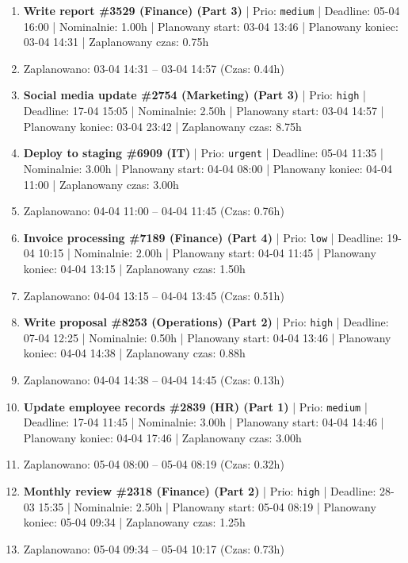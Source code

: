 {\begin{enumerate}
  \item [\textbf{14672}] \textbf{Write report \#3529 (Finance) (Part 3)} | Prio: \texttt{medium} | Deadline: 05-04 16:00 | Nominalnie: 1.00h | Planowany start: 03-04 13:46 | Planowany koniec: 03-04 14:31 | Zaplanowany czas: 0.75h
  \item [\textbf{PRZERWA}] Zaplanowano: 03-04 14:31 -- 03-04 14:57 (Czas: 0.44h)
  \item [\textbf{14611}] \textbf{Social media update \#2754 (Marketing) (Part 3)} | Prio: \texttt{high} | Deadline: 17-04 15:05 | Nominalnie: 2.50h | Planowany start: 03-04 14:57 | Planowany koniec: 03-04 23:42 | Zaplanowany czas: 8.75h
  \item [\textbf{14597}] \textbf{Deploy to staging \#6909 (IT)} | Prio: \texttt{urgent} | Deadline: 05-04 11:35 | Nominalnie: 3.00h | Planowany start: 04-04 08:00 | Planowany koniec: 04-04 11:00 | Zaplanowany czas: 3.00h
  \item [\textbf{PRZERWA}] Zaplanowano: 04-04 11:00 -- 04-04 11:45 (Czas: 0.76h)
  \item [\textbf{14678}] \textbf{Invoice processing \#7189 (Finance) (Part 4)} | Prio: \texttt{low} | Deadline: 19-04 10:15 | Nominalnie: 2.00h | Planowany start: 04-04 11:45 | Planowany koniec: 04-04 13:15 | Zaplanowany czas: 1.50h
  \item [\textbf{PRZERWA}] Zaplanowano: 04-04 13:15 -- 04-04 13:45 (Czas: 0.51h)
  \item [\textbf{14614}] \textbf{Write proposal \#8253 (Operations) (Part 2)} | Prio: \texttt{high} | Deadline: 07-04 12:25 | Nominalnie: 0.50h | Planowany start: 04-04 13:46 | Planowany koniec: 04-04 14:38 | Zaplanowany czas: 0.88h
  \item [\textbf{PRZERWA}] Zaplanowano: 04-04 14:38 -- 04-04 14:45 (Czas: 0.13h)
  \item [\textbf{14670}] \textbf{Update employee records \#2839 (HR) (Part 1)} | Prio: \texttt{medium} | Deadline: 17-04 11:45 | Nominalnie: 3.00h | Planowany start: 04-04 14:46 | Planowany koniec: 04-04 17:46 | Zaplanowany czas: 3.00h
  \item [\textbf{PRZERWA}] Zaplanowano: 05-04 08:00 -- 05-04 08:19 (Czas: 0.32h)
  \item [\textbf{14618}] \textbf{Monthly review \#2318 (Finance) (Part 2)} | Prio: \texttt{high} | Deadline: 28-03 15:35 | Nominalnie: 2.50h | Planowany start: 05-04 08:19 | Planowany koniec: 05-04 09:34 | Zaplanowany czas: 1.25h
  \item [\textbf{PRZERWA}] Zaplanowano: 05-04 09:34 -- 05-04 10:17 (Czas: 0.73h)

\end{enumerate}}

